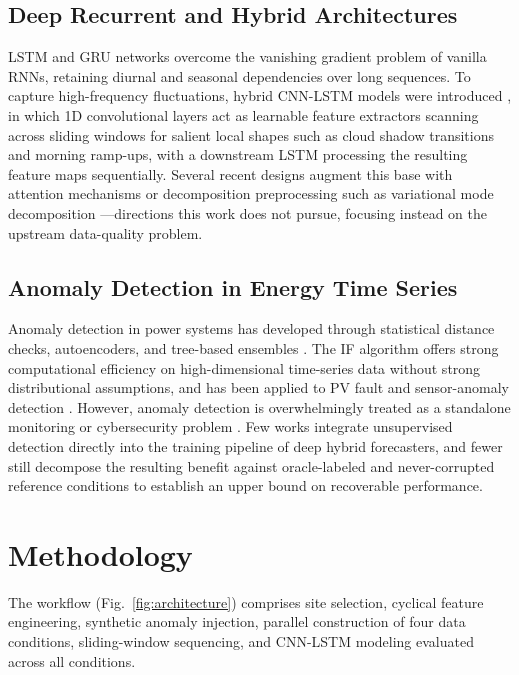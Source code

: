 \documentclass[conference]{IEEEtran}
\begin{document}
\subsection{Deep Recurrent and Hybrid Architectures}
LSTM \cite{hochreiter1997lstm} and GRU networks overcome the vanishing gradient problem of vanilla RNNs, retaining diurnal and seasonal dependencies over long sequences. To capture high-frequency fluctuations, hybrid CNN-LSTM models were introduced \cite{zang2020cnnlstm, obiora2021hourly, qu2021dayahead, boucetta2024enhanced, zhou2024enhancing}, in which 1D convolutional layers act as learnable feature extractors scanning across sliding windows for salient local shapes such as cloud shadow transitions and morning ramp-ups, with a downstream LSTM processing the resulting feature maps sequentially. Several recent designs augment this base with attention mechanisms \cite{qu2021dayahead, zhou2024enhancing} or decomposition preprocessing such as variational mode decomposition \cite{boucetta2024enhanced}---directions this work does not pursue, focusing instead on the upstream data-quality problem.

\subsection{Anomaly Detection in Energy Time Series}
Anomaly detection in power systems has developed through statistical distance checks, autoencoders, and tree-based ensembles \cite{zhang2021survey}. The IF algorithm \cite{liu2008isolation} offers strong computational efficiency on high-dimensional time-series data without strong distributional assumptions, and has been applied to PV fault and sensor-anomaly detection \cite{jorry2026unsupervised}. However, anomaly detection is overwhelmingly treated as a standalone monitoring or cybersecurity problem \cite{zhang2021survey}. Few works integrate unsupervised detection directly into the training pipeline of deep hybrid forecasters, and fewer still decompose the resulting benefit against oracle-labeled and never-corrupted reference conditions to establish an upper bound on recoverable performance.

\section{Methodology}

The workflow (Fig.~\ref{fig:architecture}) comprises site selection, cyclical feature engineering, synthetic anomaly injection, parallel construction of four data conditions, sliding-window sequencing, and CNN-LSTM modeling evaluated across all conditions.
\end{document}
